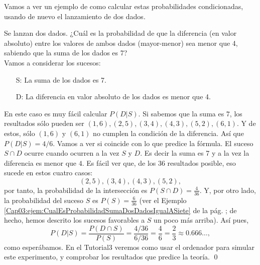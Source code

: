 %
%
%
%
%

Vamos a ver un ejemplo de como calcular estas probabilidades condicionadas, usando de nuevo el lanzamiento de dos dados.
    \begin{Ejemplo}
    \label{Cap03:probabilidadCondicionadaLanzamientoDosDados}
    Se lanzan dos dados. ¿Cuál es la probabilidad de que la diferencia (en valor absoluto) entre los valores de ambos dados (mayor-menor) sea menor que 4, sabiendo que la suma de los dados es 7?\\
    Vamos a considerar los sucesos:
    \begin{itemize}
        \item[S:] La suma de los dados es 7.
        \item[D:] La diferencia en valor absoluto de los dados es menor que 4.
    \end{itemize}
    En este caso es muy fácil calcular $P(D|S)$. Si sabemos que la suma es $7$, los resultados sólo pueden ser $(1,6),(2,5),(3,4),(4,3),(5,2),(6,1)$. Y de estos, sólo $(1,6)$ y $(6,1)$ no cumplen la condición de la diferencia. Así que $P(D|S)=4/6$. Vamos a ver si coincide con lo que predice la fórmula. El suceso $S\cap D$ ocurre cuando ocurren {\sf a la vez} $S$ y $D$. Es decir la suma es 7 {\sf y a la vez} la diferencia es menor que $4$. Es fácil ver que, de los 36 resultados posible, eso sucede en estos cuatro casos: \[(2,5),(3,4),(4,3),(5,2),\]
    por tanto, la probabilidad de la intersección es $P(S\cap D)=\frac{4}{36}$. Y, por otro lado, la probabilidad del suceso $S$ es $P(S)=\frac{6}{36}$ (ver el Ejemplo \ref{Cap03:ejem:CualEsProbabilidadSumaDosDadosIgualASiete} de la pág. \pageref{Cap03:ejem:CualEsProbabilidadSumaDosDadosIgualASiete}; de hecho, hemos descrito los sucesos favorables a $S$ un poco más arriba). Así pues,
    \[P(D|S)=\dfrac{P(D\cap S)}{P(S)}=\dfrac{4/36}{6/36}=\dfrac{4}{6}=\dfrac{2}{3}\approx 0.666\ldots,\]
    como esperábamos. En el Tutorial3 veremos como usar el ordenador para simular este experimento, y comprobar los resultados que predice la teoría.
    \qed
    \end{Ejemplo}
